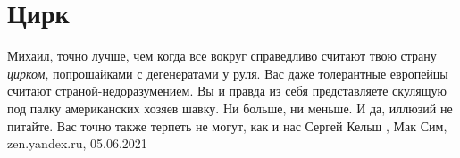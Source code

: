  
 
 
 
 
\chapter{Цирк}
\label{sec:slova.cirk}

Михаил, точно лучше, чем когда все вокруг справедливо считают твою страну
\emph{цирком}, попрошайками с дегенератами у руля. Вас даже толерантные
европейцы считают страной-недоразумением. Вы и правда из себя представляете
скулящую под палку американских хозяев шавку. Ни больше, ни меньше. И да,
иллюзий не питайте. Вас точно также терпеть не могут, как и нас
Сергей Кельш
, 
Мак Сим, zen.yandex.ru, 05.06.2021
